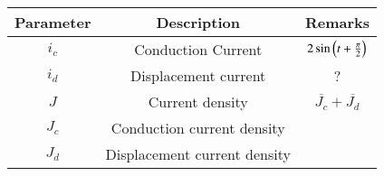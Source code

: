 \setlength{\arrayrulewidth}{0.3mm}
\setlength{\tabcolsep}{20pt}
\renewcommand{\arraystretch}{1.5}

\begin{tabular}{|c|c|c|}
\hline
Parameter& Description & Remarks\\
\hline
$i_c$ & Conduction Current & $2\sin\left(t + \frac{\pi}{2}\right)$\\
\hline
$i_d$ & Displacement current & ?\\
\hline
$J$ & Current density & $\overline{J_c} + \overline{J_d}$\\
\hline
$J_c$ & Conduction current density & \\
\hline
$J_d$ & Displacement current density & \\
\hline
\end{tabular}